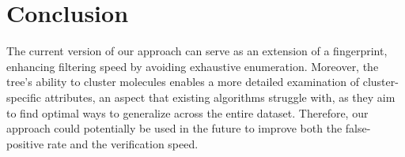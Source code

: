 \section{Conclusion}

The current version of our approach can serve as an extension of a fingerprint, enhancing filtering speed by avoiding exhaustive enumeration. Moreover, 
the tree's ability to cluster molecules enables a more detailed examination of cluster-specific attributes, an aspect that existing algorithms struggle with, 
as they aim to find optimal ways to generalize across the entire dataset. Therefore, our approach could potentially be used in the future to improve both the 
false-positive rate and the verification speed.
